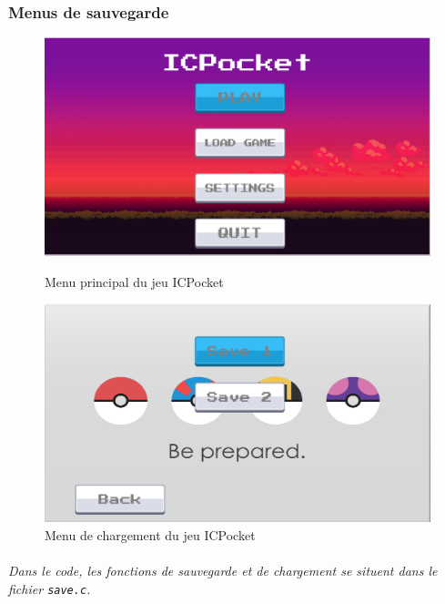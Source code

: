 \documentclass[12pt,a4paper, twoside]{article}
\begin{document}
     \subsubsection{Menus de sauvegarde}
     \begin{figure}[h!]
        \centering
        \begin{minipage}[t]{0.48\textwidth}
            \centering
            \includegraphics[width=\textwidth]{menuicmonp.png}
            \caption{Menu principal du jeu ICPocket}
            \label{fig:menuicmonp}
        \end{minipage}
        \hfill
        \begin{minipage}[t]{0.48\textwidth}
            \centering
            \includegraphics[width=\textwidth]{menuload.png}
            \caption{Menu de chargement du jeu ICPocket}
            \label{fig:menuload}
        \end{minipage}
    \end{figure}
    \paragraph{} \emph{Dans le code, les fonctions de sauvegarde et de chargement se situent dans le fichier \texttt{save.c}.}
\end{document}

